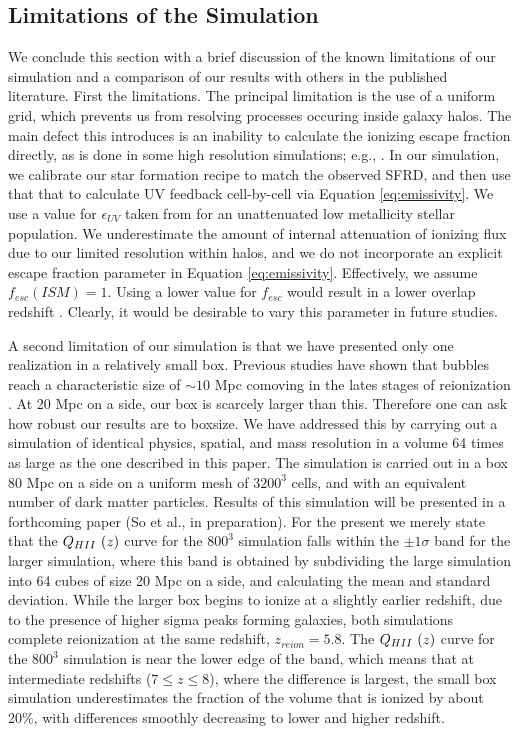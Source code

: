 \subsection{Limitations of the Simulation}

We conclude this section with a brief discussion of the known limitations of our simulation and a comparison of our results with others in the published literature. First the limitations. The principal limitation is the use of a uniform grid, which prevents us from resolving processes occuring inside galaxy halos. The main defect this introduces is an inability to calculate the ionizing escape fraction directly, as is done in some high resolution simulations; e.g., \cite{WiseCen2009,FernandezShull2011}. In our simulation, we calibrate our star formation recipe to match the observed SFRD, and then use that that to calculate UV feedback cell-by-cell via Equation \eqref{eq:emissivity}. We use a value for $\epsilon_{UV}$ taken from \cite{RicottiEtAl2002} for an unattenuated low metallicity stellar population. We underestimate the amount of internal attenuation of ionizing flux due to our limited resolution within halos, and we do not incorporate an explicit escape fraction parameter in Equation \eqref{eq:emissivity}. Effectively, we assume $f_{esc}(ISM)=1$. Using a lower value for $f_{esc}$ would result in a lower overlap redshift \citep{PetkovaSpringel2011a}. Clearly, it would be desirable to vary this parameter in future studies. 

A second limitation of our simulation is that we have presented only one realization in a relatively small box. Previous studies have shown that \hii bubbles reach a characteristic size of $\sim 10$ Mpc comoving in the lates stages of reionization \citep{FurlanettoEtAl2004,ZahnEtAl2007,ShinEtAl2008}. At 20 Mpc on a side, our box is scarcely larger than this. Therefore one can ask how robust our results are to boxsize. We have addressed this by carrying out a simulation of identical physics, spatial, and mass resolution in a volume 64 times as large as the one described in this paper. The simulation is carried out in a box 80 Mpc on a side on a uniform mesh of $3200^3$ cells, and with an equivalent number of dark matter particles. Results of this simulation will be presented in a forthcoming paper (So et al., in preparation). For the present we merely state that the $Q_{\hii}(z)$ curve for the $800^3$ simulation falls within the $\pm 1 \sigma$ band for the larger simulation, where this band is obtained by subdividing the large simulation into 64 cubes of size 20 Mpc on a side, and calculating the mean and standard deviation. While the larger box begins to ionize at a slightly earlier redshift, due to the presence of higher sigma peaks forming galaxies, both simulations complete reionization at the same redshift, $z_{reion} = 5.8$. The $Q_{\hii}(z)$ curve for the $800^3$ simulation is near the lower edge of the band, which means that at intermediate redshifts ($7 \leq z \leq 8$), where the difference is largest, the small box simulation underestimates the fraction of the volume that is ionized by about 20\%, with differences smoothly decreasing to lower and higher redshift. 

